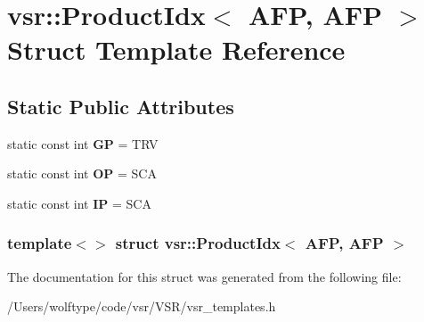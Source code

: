 \hypertarget{structvsr_1_1_product_idx_3_01_a_f_p_00_01_a_f_p_01_4}{\section{vsr\-:\-:Product\-Idx$<$ A\-F\-P, A\-F\-P $>$ Struct Template Reference}
\label{structvsr_1_1_product_idx_3_01_a_f_p_00_01_a_f_p_01_4}
}
\subsection*{Static Public Attributes}
\begin{DoxyCompactItemize}
\item 
\hypertarget{structvsr_1_1_product_idx_3_01_a_f_p_00_01_a_f_p_01_4_a58527052f85e75981fddf87eaa8787a4}{static const int {\bfseries G\-P} = T\-R\-V}\label{structvsr_1_1_product_idx_3_01_a_f_p_00_01_a_f_p_01_4_a58527052f85e75981fddf87eaa8787a4}

\item 
\hypertarget{structvsr_1_1_product_idx_3_01_a_f_p_00_01_a_f_p_01_4_a76c8ce78aa9a0ba359a789149145dac1}{static const int {\bfseries O\-P} = S\-C\-A}\label{structvsr_1_1_product_idx_3_01_a_f_p_00_01_a_f_p_01_4_a76c8ce78aa9a0ba359a789149145dac1}

\item 
\hypertarget{structvsr_1_1_product_idx_3_01_a_f_p_00_01_a_f_p_01_4_a372efe5397b8d8928b3987023e68039c}{static const int {\bfseries I\-P} = S\-C\-A}\label{structvsr_1_1_product_idx_3_01_a_f_p_00_01_a_f_p_01_4_a372efe5397b8d8928b3987023e68039c}

\end{DoxyCompactItemize}
\subsubsection*{template$<$$>$ struct vsr\-::\-Product\-Idx$<$ A\-F\-P, A\-F\-P $>$}



The documentation for this struct was generated from the following file\-:\begin{DoxyCompactItemize}
\item 
/\-Users/wolftype/code/vsr/\-V\-S\-R/vsr\-\_\-templates.\-h\end{DoxyCompactItemize}
